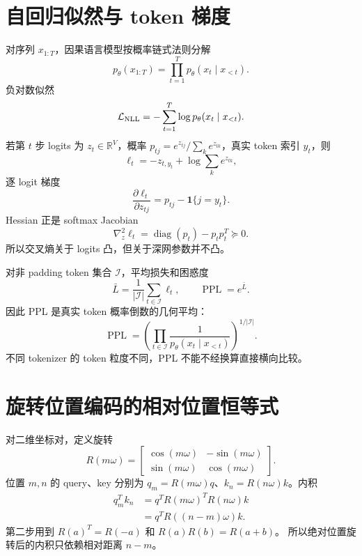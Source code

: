\documentclass[11pt]{article}
\numberwithin{equation}{section}
\newcommand{\R}{\mathbb{R}}
\newcommand{\1}{\mathbf{1}}
\newcommand{\cL}{\mathcal{L}}
\newcommand{\diag}{\operatorname{diag}}
\begin{document}
\section{自回归似然与 token 梯度}

对序列 $x_{1:T}$，因果语言模型按概率链式法则分解
\begin{equation}
 p_\theta(x_{1:T})=\prod_{t=1}^{T}p_\theta(x_t\mid x_{<t}).
\end{equation}
负对数似然
\begin{equation}
 \cL_{\rm NLL}=-\sum_{t=1}^{T}\log p_\theta(x_t\mid x_{<t}).
\end{equation}
若第 $t$ 步 logits 为 $z_t\in\R^{V}$，概率
$p_{tj}=e^{z_{tj}}/\sum_ke^{z_{tk}}$，真实 token 索引 $y_t$，则
\begin{equation}
 \ell_t=-z_{t,y_t}+\log\sum_ke^{z_{tk}},
\end{equation}
逐 logit 梯度
\begin{equation}
 \frac{\partial\ell_t}{\partial z_{tj}}
 =p_{tj}-\1\{j=y_t\}.
\end{equation}
Hessian 正是 softmax Jacobian
\begin{equation}
 \nabla_z^2\ell_t=\diag(p_t)-p_tp_t^T\succeq0.
\end{equation}
所以交叉熵关于 logits 凸，但关于深网参数并不凸。

对非 padding token 集合 $\mathcal I$，平均损失和困惑度
\begin{equation}
 \bar L=\frac1{|\mathcal I|}\sum_{t\in\mathcal I}\ell_t,
 \qquad \operatorname{PPL}=e^{\bar L}.
\end{equation}
因此 PPL 是真实 token 概率倒数的几何平均：
\begin{equation}
 \operatorname{PPL}=\left(
 \prod_{t\in\mathcal I}\frac1{p_\theta(x_t\mid x_{<t})}
 \right)^{1/|\mathcal I|}.
\end{equation}
不同 tokenizer 的 token 粒度不同，PPL 不能不经换算直接横向比较。

\section{旋转位置编码的相对位置恒等式}

对二维坐标对，定义旋转
\begin{equation}
 R(m\omega)=
 \begin{bmatrix}
 \cos(m\omega)&-\sin(m\omega)\\
 \sin(m\omega)&\cos(m\omega)
 \end{bmatrix}.
\end{equation}
位置 $m,n$ 的 query、key 分别为
$q_m=R(m\omega)q$、$k_n=R(n\omega)k$。内积
\begin{align}
 q_m^Tk_n
 &=q^TR(m\omega)^TR(n\omega)k\\
 &=q^TR((n-m)\omega)k.
\end{align}
第二步用到 $R(a)^T=R(-a)$ 和 $R(a)R(b)=R(a+b)$。
所以绝对位置旋转后的内积只依赖相对距离 $n-m$。
\end{document}
